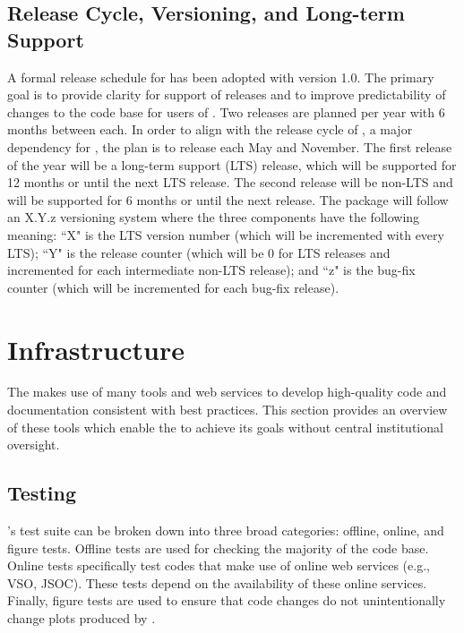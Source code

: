 \subsection{Release Cycle, Versioning, and Long-term Support}
\label{sec:release}

A formal release schedule for \sunpypkg has been adopted with version 1.0.
The primary goal is to provide clarity for support of releases and to improve predictability of changes to the code base for users of \sunpypkg.
Two releases are planned per year with 6 months between each.
In order to align with the release cycle of \astropypkg, a major dependency for \sunpypkg, the plan is to release each May and November.
The first release of the year will be a long-term support (LTS) release, which will be supported for 12 months or until the next LTS release.
The second release will be non-LTS and will be supported for 6 months or until the next release.
The \sunpypkg package will follow an X.Y.z versioning system where the three components have the following meaning:
``X" is the LTS version number (which will be incremented with every LTS);
``Y" is the release counter (which will be 0 for LTS releases and incremented for each intermediate non-LTS release);
and ``z" is the bug-fix counter (which will be incremented for each bug-fix release).

\section{Infrastructure}
\label{sec:infrastructure}

The \sunpyproj makes use of many tools and web services to develop high-quality code and documentation consistent with best practices.
This section provides an overview of these tools which enable the \sunpyproj to achieve its goals without central institutional oversight.

\subsection{Testing}
\label{sec:continuous-integration}

\sunpypkg's test suite can be broken down into three broad categories: offline, online, and figure tests.
Offline tests are used for checking the majority of the code base.
Online tests specifically test codes that make use of online web services (e.g., VSO, JSOC).
These tests depend on the availability of these online services.
Finally, figure tests are used to ensure that code changes do not unintentionally change plots produced by \sunpypkg.

